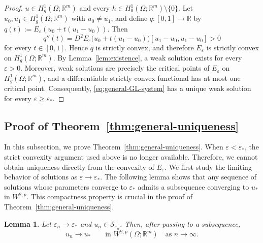 \documentclass[11pt]{amsart}
\theoremstyle{definition}
\theoremstyle{plain}
\newtheorem{lemma}[theorem]{Lemma}
\newcommand{\R}{\mathbb{R}}
\numberwithin{equation}{section}
\begin{document}
\begin{proof}
	$u\in H_g^1(\Omega;\R^m)$ and every
	$h\in H_0^1(\Omega;\R^m)\setminus\{0\}$. Let
	$u_0,u_1\in H_g^1(\Omega;\R^m)$ with $u_0\neq u_1$, and define
	$q\colon[0,1]\to\R$ by
	$q(t):=E_\varepsilon(u_0+t(u_1-u_0))$. Then
	\[
		q''(t)
		=
		D^2E_\varepsilon
		\bigl(u_0+t(u_1-u_0)\bigr)
		[u_1-u_0,u_1-u_0]
		>
		0
	\]
	for every $t\in[0,1]$. Hence $q$ is strictly convex, and therefore
	$E_\varepsilon$ is strictly convex on $H_g^1(\Omega;\R^m)$.
	By Lemma~\ref{lem:existence}, a weak solution exists for every
	$\varepsilon>0$. Moreover, weak solutions are precisely the critical
	points of $E_\varepsilon$ on $H_g^1(\Omega;\R^m)$, and a
	differentiable strictly convex functional has at most one critical
	point. Consequently, \eqref{eq:general-GL-system} has a unique weak
	solution for every $\varepsilon\geq\varepsilon_*$.

\end{proof}

\subsection{Proof of Theorem~\ref{thm:general-uniqueness}}


In this subsection, we prove Theorem~\ref{thm:general-uniqueness}. When
$\varepsilon<\varepsilon_*$, the strict convexity argument used above is
no longer available. Therefore, we cannot obtain uniqueness directly from
the convexity of $E_\varepsilon$. We first study the limiting behavior of
solutions as $\varepsilon\to\varepsilon_*$. The following lemma shows that
any sequence of solutions whose parameters converge to $\varepsilon_*$
admits a subsequence converging to $u_*$ in $W^{2,p}$. This compactness
property is crucial in the proof of Theorem~\ref{thm:general-uniqueness}.


\begin{lemma}\label{lem:compactness}
	Let $\varepsilon_n\to\varepsilon_*$ and
	$u_n\in\mathcal{S}_{\varepsilon_n}$. Then, after passing to a
	subsequence,
	\[
		u_n\to u_*
		\qquad\text{in }W^{2,p}(\Omega;\R^m)
		\quad\text{as }n\to\infty.
	\]
\end{lemma}
\end{document}
